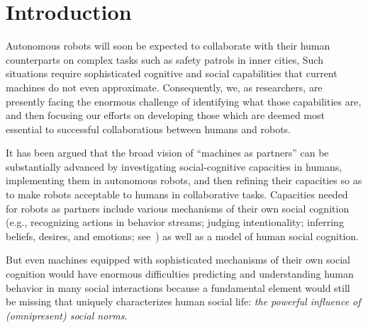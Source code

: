 \section{Introduction}
\label{sec:intro}

Autonomous robots will soon be expected to collaborate with their
human counterparts on complex tasks such as safety patrols in inner
cities, 
Such situations require sophisticated cognitive and social
capabilities that current machines do not even approximate.
Consequently, we, as researchers, are presently facing the enormous
challenge of identifying what those capabilities are, and then
focusing our efforts on developing those which are deemed most
essential to successful collaborations between humans and robots.

It has been argued that the broad vision of
``machines as partners'' can be substantially advanced by investigating
social-cognitive capacities in humans, implementing them in autonomous
robots, and then refining their capacities so as to make robots
acceptable to humans in collaborative tasks.  Capacities needed for
robots as partners include various mechanisms of their own social
cognition (e.g., recognizing actions in behavior streams; judging
intentionality; inferring beliefs, desires, and emotions;
see~\cite{malle_tree_2015}) as well as a model of human social
cognition.%

But even machines equipped with sophisticated mechanisms of their own
social cognition would have enormous difficulties predicting and
understanding human behavior in many social interactions because a
fundamental element would still be missing that uniquely characterizes
human social life: {\em the powerful influence of (omnipresent) social
  norms}.  

